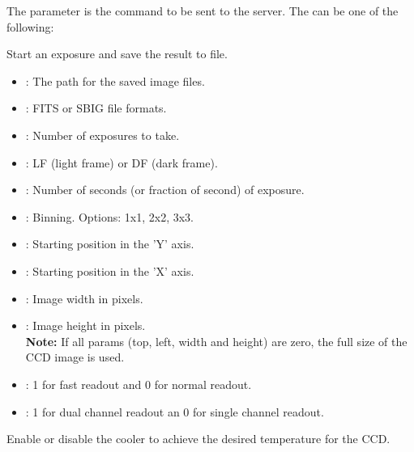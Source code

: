 \documentclass[a4paper,english]{article}
\begin{document}
The  parameter is the command to be sent to the server. The  can be one of the following:

\begin{Description}\setlength{\itemsep}{0cm}
\item[\Arg{capture}] Start an exposure and save the result to file.

	                  
	
	\begin{itemize}
		\item {}: The path for the saved image files.
		\item {}: FITS or SBIG file formats.
		\item {}: Number of exposures to take.
		\item {}: LF (light frame) or DF (dark frame).
		\item {}: Number of seconds (or fraction of second) of exposure.
		\item {}: Binning. Options: 1x1, 2x2, 3x3.
		\item {}: Starting position in the 'Y' axis.
		\item {}: Starting position in the 'X' axis.
		\item {}: Image width in pixels.
		\item {}: Image height in pixels. \\
		
		\textbf{Note:} If all params (top, left, width and height) are zero, the full size of the CCD image is used. \\
		
		\item {}: 1 for fast readout and 0 for normal readout.
		\item {}: 1 for dual channel readout an 0 for single channel readout.
	\end{itemize}
	
\item[\Arg{settemp}] Enable or disable the cooler to achieve the desired temperature for the CCD. 

	      
	

\end{Description}
\end{document}
